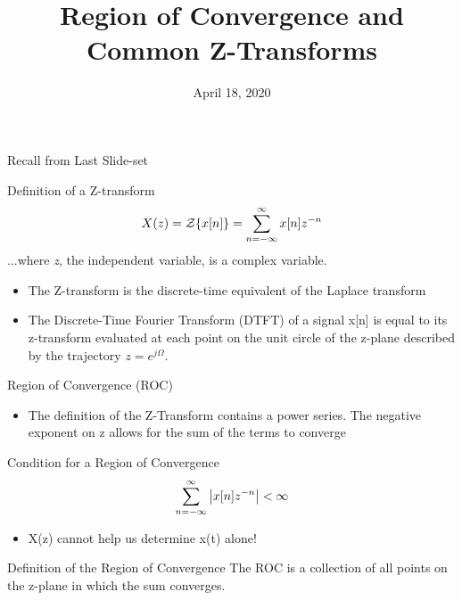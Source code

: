 \documentclass{beamer}
\title{Region of Convergence and Common Z-Transforms}
\date{April 18, 2020}
\begin{document}
\maketitle

\begin{frame}{Recall from Last Slide-set}

    \begin{exampleblock}{Definition of a Z-transform}
      \begin{equation*}
        \mathnormal{{X(z)} = \mathcal{Z}\{x[n]\} = \sum_{n=-\infty}^{\infty} x[n] z^{-n}}
      \end{equation*}
      ...where \emph{z}, the independent variable, is a complex variable.
    \end{exampleblock}
    
    \begin{itemize}
        \item The Z-transform is the discrete-time equivalent of the Laplace transform
        
        \item The Discrete-Time Fourier Transform (DTFT) of a signal x[n] is equal to its z-transform evaluated at each point on the unit circle of the z-plane described by the trajectory $z=e^{j\Omega}$.
    \end{itemize}
    
\end{frame}

\begin{frame}{Region of Convergence (ROC)}
    \begin{itemize}
        \item The definition of the Z-Transform contains a power series. The negative exponent on z allows for the sum of the terms to converge
    \end{itemize}

    \begin{exampleblock}{Condition for a Region of Convergence}
      \begin{equation*}
        \mathnormal{\sum_{n=-\infty}^{\infty} \left|x[n] z^{-n}\right| < \infty}
      \end{equation*}
    \end{exampleblock}
    
    \begin{itemize}
        \item X(z) cannot help us determine x(t) alone! 
    \end{itemize}
    
     \begin{alertblock}{Definition of the Region of Convergence}
      The ROC is a collection of all points on the z-plane in which the sum converges.
    \end{alertblock}
    
\end{frame}
\end{document}
